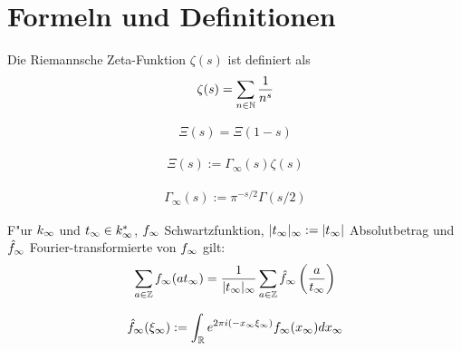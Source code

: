 \section{Formeln und Definitionen}
\label{sec:riemann2}

\begin{defi}
	\label{def:zeta}
	Die Riemannsche Zeta-Funktion $\zeta(s)$  ist definiert als
	\begin{align}
		\zeta (s) = \sum_{n\in \mathbb{N}} \frac{1}{n^s}
	\end{align}
\end{defi}

\begin{satz}
	\label{form:funktionalgleichung}
	\begin{align}
		 \Xi(s) = \Xi(1-s)
	\end{align}
\end{satz}


\begin{defi}
	\label{def:xi}
	\begin{align}
		\Xi(s) := \Gamma_\infty(s) \zeta(s)
	\end{align}
\end{defi}

\begin{defi}
	\label{def:gamma_infty}
	\begin{align}
		\Gamma_\infty(s) := \pi^{-s/2} \Gamma(s/2)
	\end{align}
\end{defi}

\begin{satz}
	\label{satz:poisson}
	F"ur $k_\infty$ und $t_\infty \in k_\infty^*$, $f_\infty$ Schwartzfunktion, $|t_\infty|_\infty := |t_\infty|$ Absolutbetrag und $\hat{f}_\infty$ Fourier-transformierte von $f_\infty$ gilt:
	\begin{align}
		\sum_{a \in \mathbb{Z}} f_\infty (a t_\infty) = \frac{1}{|t_\infty|_\infty} \sum_{a \in \mathbb{Z}} \hat{f}_\infty \left( \frac{a} {t_\infty} \right)
	\end{align}
\end{satz}

\begin{defi}[Fouriertransformation]
	\label{def:fourier}
	\begin{align}
		\hat{f}_\infty(\xi_\infty) := \int_{\mathbb{R}}{e^{ 2\pi i (-x_\infty\xi_\infty) }f_\infty(x_\infty)dx_\infty}
	\end{align}
\end{defi}